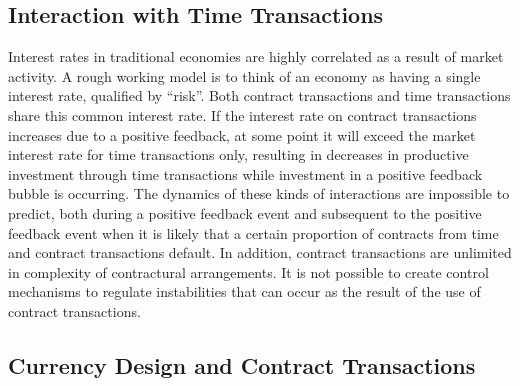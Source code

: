 \subsection{Interaction with Time Transactions}

Interest rates in traditional economies are highly correlated as a result of market activity. A
rough working model is to think of an economy as having a single interest rate, qualified by
``risk''.  Both contract transactions and time transactions share this common interest rate. If the
interest rate on contract transactions increases due to a positive feedback, at some point
it will exceed the market interest rate for time transactions only, resulting in decreases in
productive investment through time transactions while investment in a positive feedback bubble is
occurring. The dynamics of these kinds of interactions are impossible to predict, both during a
positive feedback event and subsequent to the positive feedback event when it is likely that a
certain proportion of contracts from time and contract transactions default. In addition, contract
transactions are unlimited in complexity of contractural arrangements. It is not possible to create
control mechanisms to regulate instabilities that can occur as the result of the use of contract
transactions.

\subsection{Currency Design and Contract Transactions}
